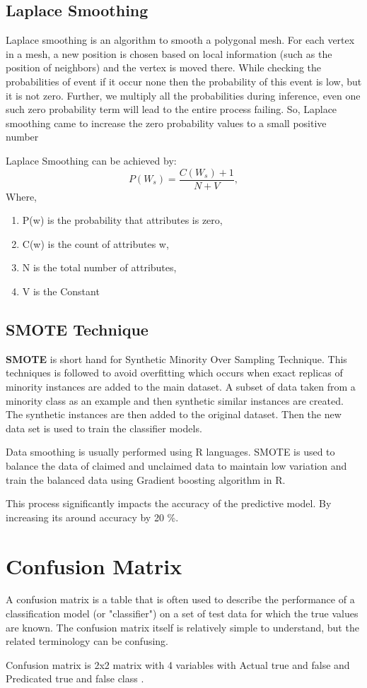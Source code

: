\subsection{Laplace Smoothing}
Laplace smoothing is an algorithm to smooth a polygonal mesh. For each vertex in a mesh, a new position is chosen based on local information (such as the position of neighbors) and the vertex is moved there. While checking the  probabilities of event if it occur none then the probability of this event is low, but it is not zero. Further, we  multiply all the probabilities during inference, even one such zero probability term will lead to the entire process failing. So, Laplace smoothing came to increase the zero probability values to a small positive number
\par Laplace Smoothing can be achieved by:
$$
P(W_s) = \frac{C(W_s)+1}{N+V},
$$
Where,
\begin{enumerate}
\item P(w) is the  probability that attributes is zero,
\item C(w) is the count of attributes w,
\item N is the total number of attributes,
\item V is the Constant
\end{enumerate}

\subsection{SMOTE Technique}
\textbf{SMOTE} is short hand for Synthetic Minority Over Sampling Technique. This techniques is followed to avoid overfitting which occurs when exact replicas of minority instances are added to the main dataset. A subset of data taken from a minority class as an example and then synthetic similar instances are created. The synthetic instances are then added to the original dataset. Then the new data set is used to train the classifier models.\cite{witten2016data}
\par 
Data smoothing is usually performed using R languages. SMOTE is used to balance the data of claimed and unclaimed data to maintain low variation and train the balanced data using Gradient boosting algorithm in R. 
\par 
This process significantly impacts the accuracy of the predictive model.  By increasing its around accuracy by 20 \%.

\section{Confusion Matrix}
A confusion matrix is a table that is often used to describe the performance of a classification model (or "classifier") on a set of test data for which the true values are known. The confusion matrix itself is relatively simple to understand, but the related terminology can be confusing.	
\par 
Confusion matrix is 2x2 matrix with 4 variables with Actual true and false and Predicated true and false class .

